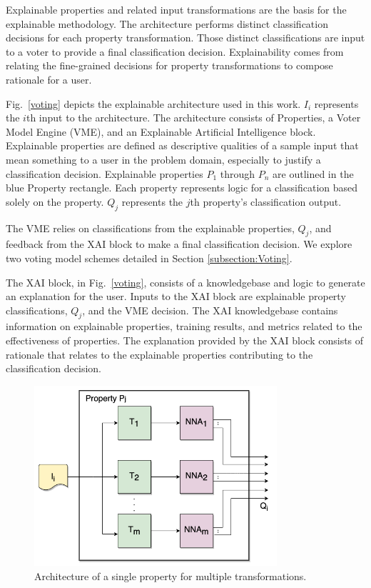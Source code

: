 \documentclass[conference]{IEEEtran}
\begin{document}
Explainable properties and related input transformations are the basis for the explainable methodology.  The architecture performs distinct classification decisions for each property transformation.  Those distinct classifications are input to a voter to provide a final classification decision.  Explainability comes from relating the fine-grained decisions for property transformations to compose rationale for a user.

Fig.~\ref{voting} depicts the explainable architecture used in this work.  $I_i$ represents the $i$th input to the architecture.  The architecture consists of Properties, a Voter Model Engine (VME),  and an Explainable Artificial Intelligence block.   Explainable properties are defined as descriptive qualities of a sample input that mean something to a user in the problem domain, especially to justify a classification decision.   Explainable properties $P_1$ through $P_n$ are outlined in the blue Property rectangle.  Each property represents logic for a classification based solely on the property.   $Q_j$ represents the $j$th property's classification output.

The VME relies on classifications from the explainable properties, $Q_j$, and feedback from the XAI block to make a final classification decision.   We explore two voting model schemes detailed in Section \ref{subsection:Voting}.

The XAI block, in Fig.~\ref{voting}, consists of a knowledgebase and logic to generate an explanation for the user.  Inputs to the XAI block are explainable property classifications, $Q_j$, and the VME decision.  The XAI knowledgebase contains information on explainable properties, training results, and metrics related to the effectiveness of properties.  The explanation provided by the XAI block consists of rationale that relates to the explainable properties contributing to the classification decision.

 \begin{figure}[htbp]
\centerline{\includegraphics[width=90mm]{./images/property_transforms.png}}
\caption{Architecture of a single property for multiple transformations.}
\label{proptrans}
\end{figure} 
\end{document}
